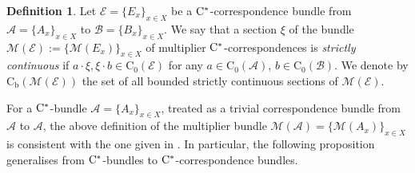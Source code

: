 \documentclass[11 pt, leqno]{amsart}
\numberwithin{equation}{section}
\theoremstyle{plain}
\theoremstyle{definition}
\newtheorem {defn}[thm] {Definition}
\newcommand*{\nb}{\nobreakdash}
\newcommand*{\contz}{\mathrm{C_0}}%
\newcommand*{\contb}{\mathrm{C_b}}%
\newcommand{\B}{\mathcal B}
\newcommand{\M}{\mathcal M}
\newcommand{\EE}{\mathcal E}
\newcommand{\A}{\mathcal A}
\newcommand{\cst}{\ifmmode\mathrm{C}^*\else{$\mathrm{C}^*$}\fi}
\begin{document}
\begin{defn}
Let $\EE=\{E_x\}_{x\in X}$ be a $\cst$-correspondence bundle from  $\A=\{A_x\}_{x\in X}$ to $\B=\{B_x\}_{x\in X}$. We say that a section $\xi$ of the bundle $\M(\EE):=\{\M(E_x)\}_{x\in X}$  of multiplier $\cst$\nb-correspondences is \emph{strictly continuous} if $a\cdot \xi, \xi \cdot b\in \contz(\EE)$ for any $a\in \contz(\A)$, $b\in \contz(\B)$. 
We denote by $\contb(\M(\EE))$ the set of all bounded strictly continuous sections of $\M(\EE)$.
\end{defn} 

For a $\cst$-bundle  $\A=\{A_x\}_{x\in X}$, treated as a trivial correspondence bundle from $\A$ to $\A$, the above definition of the multiplier bundle $\M(\A)=\{\M(A_x)\}_{x\in X}$ is consistent with the one given in \cite[Section 3]{Multipliers}. 
In particular, the following proposition generalises \cite[Theorem 3.3]{Multipliers} from $\cst$-bundles to $\cst$-correspondence bundles.
\end{document}
